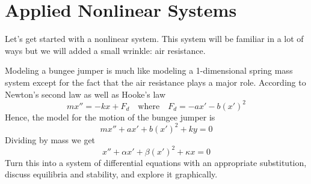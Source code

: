 \newpage\section{Applied Nonlinear Systems}
Let's get started with a nonlinear system.  This system will be familiar in a lot of ways
but we will added a small wrinkle: air resistance.





\begin{problem}
    Modeling a bungee jumper is much like modeling a 1-dimensional spring mass system
    except for the fact that
    the air resistance plays a major role.  According to Newton's second law as well as
    Hooke's law
    \[ m x'' = -kx + F_d \quad \text{where} \quad F_d = -a x' -b \left( x' \right)^2 \]
    Hence, the model for the motion of the bungee jumper is
    \[ mx'' + ax' + b\left( x' \right)^2 + ky = 0 \]
    Dividing by mass we get
    \[ x'' + \alpha x' + \beta \left( x' \right)^2 + \kappa x = 0 \]
    Turn this into a system of differential equations with an appropriate substitution,
    discuss equilibria and stability, and explore it graphically.
\end{problem}


